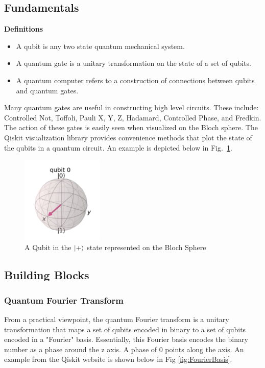 \documentclass[journal]{IEEEtran}
\begin{document}
\subsection{Fundamentals}
\textbf{Definitions}
\begin{itemize}
    \item A qubit is any two state quantum mechanical system.
    \item A quantum gate is a unitary transformation on the state of a set of qubits.
    \item A quantum computer refers to a construction of connections between qubits and quantum gates.
\end{itemize}
Many quantum gates are useful in constructing high level circuits. These
include: Controlled Not, Toffoli, Pauli X, Y, Z, Hadamard, Controlled Phase, and
Fredkin. The action of these gates is easily seen when visualized on the Bloch
sphere. The Qiskit visualization library provides convenience methods that plot
the state of the qubits in a quantum circuit. An example is depicted below in
Fig.~\ref{fig:BlochSphere}.

\begin{figure}[H]
    \begin{center}
        \includegraphics[width=0.35\textwidth]{BlochSphere.png}
        \caption{\label{fig:BlochSphere} A Qubit in the \(\ket{+}\) state represented on the Bloch Sphere}
    \end{center}
\end{figure}

\subsection{Building Blocks}
\subsubsection{Quantum Fourier Transform}

From a practical viewpoint, the quantum Fourier transform is a unitary
transformation that maps a set of qubits encoded in binary to a set of qubits
encoded in a "Fourier" basis. Essentially, this Fourier basis encodes the binary
number as a phase around the z axis. A phase of 0 points along the axis. An
example from the Qiskit website is shown below in Fig \ref{fig:FourierBasis}.
\end{document}
